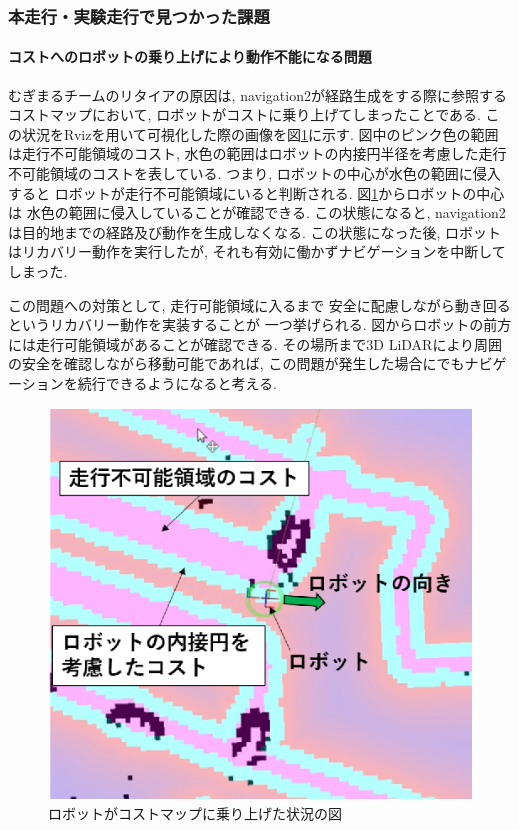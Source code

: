 \subsubsection{本走行・実験走行で見つかった課題}
\paragraph{コストへのロボットの乗り上げにより動作不能になる問題}
むぎまるチームのリタイアの原因は, navigation2が経路生成をする際に参照する
コストマップにおいて, ロボットがコストに乗り上げてしまったことである. 
この状況をRvizを用いて可視化した際の画像を図\ref{fig:mugimaru_result}に示す. 
図中のピンク色の範囲は走行不可能領域のコスト, 
水色の範囲はロボットの内接円半径を考慮した走行不可能領域のコストを表している. 
つまり, ロボットの中心が水色の範囲に侵入すると
ロボットが走行不可能領域にいると判断される. 
図\ref{fig:mugimaru_result}からロボットの中心は
水色の範囲に侵入していることが確認できる. 
この状態になると, navigation2は目的地までの経路及び動作を生成しなくなる. 
この状態になった後, ロボットはリカバリー動作を実行したが, 
それも有効に働かずナビゲーションを中断してしまった. 

この問題への対策として, 走行可能領域に入るまで
安全に配慮しながら動き回るというリカバリー動作を実装することが
一つ挙げられる. 
図からロボットの前方には走行可能領域があることが確認できる. 
その場所まで3D LiDARにより周囲の安全を確認しながら移動可能であれば, 
この問題が発生した場合にでもナビゲーションを続行できるようになると考える. 
\begin{figure}[h]
  \begin{center}
  	\includegraphics[width=0.9\linewidth]{figs/mugimaru_result.eps}
  	\caption{ロボットがコストマップに乗り上げた状況の図} 
  	\label{fig:mugimaru_result}
  \end{center}
\end{figure}

